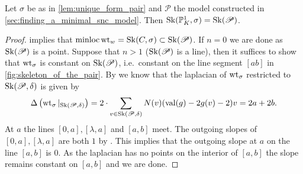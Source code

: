 \begin{proposition}\label{prop:model_P_is_KS}
	Let $\sigma$ be as in \cref{lem:unique_form_pair} and $\mathscr P$ the model constructed in \cref{sec:finding_a_minimal_snc_model}.
	Then $\operatorname{Sk}(\mathbb{P}^{1}_K, \sigma) = \operatorname{Sk}(\mathscr P)$. 
\end{proposition}
\begin{proof}
	 implies that $\operatorname{minloc} \operatorname{wt}_{w} = \operatorname{Sk}(C, \sigma) \subset \operatorname{Sk}(\mathscr P) $. 
	If $n = 0$ we are done as $\operatorname{Sk}(\mathscr P) $ is a point. 
	Suppose that $n > 1$ ($\operatorname{Sk}(\mathscr P)$ is a line), then 
	it suffices to show that $\operatorname{wt}_\sigma$ is constant on $\operatorname{Sk}(\mathscr P)$, i.e.\ constant on the line segment $[ab]$ in \cref{fig:skeleton_of_the_pair}. 
	By \cite[thm.\ 3.2.3.(3)]{bakerWeightFunctionsBerkovich2016} we know that the laplacian of $\operatorname{wt}_\sigma$ restricted to $\operatorname{Sk}(\mathscr P, \delta)$ is given by \[
		\Delta\left(\operatorname{wt}_\sigma|_{\operatorname{Sk}(\mathscr P, \delta)}\right) = 2\cdot \sum_{v \in \operatorname{Sk}(\mathscr P, \delta)} N(v)(\operatorname{val} (g) - 2g(v) - 2)v = 2a + 2b
	.\] 
	At $a$ the lines $[0, a],[\lambda, a]$ and  $[a, b]$ meet. 
	The outgoing slopes of  $[0, a], [\lambda, a]$ are both $1$ by \cite[3.2.3.(2)]{bakerWeightFunctionsBerkovich2016}. 
	This implies that the outgoing slope at $a$ on the line $[a, b]$ is $0$. 
	As the laplacian has no points on the interior of $[a, b]$ the slope remains constant on $[a, b]$ and we are done. 
\end{proof}



